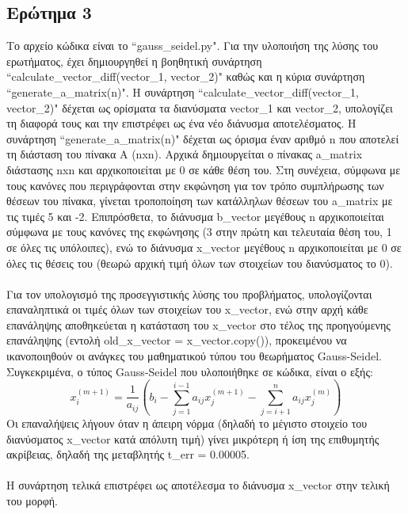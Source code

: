 \documentclass[a4paper,11pt]{article}
\newcommand{\lt}{\latintext}
\begin{document}
\subsection*{Ερώτημα 3}
Το αρχείο κώδικα είναι το {\lt ``gauss\_seidel.py"}.
Για την υλοποιήση της λύσης του ερωτήματος, έχει δημιουργηθεί η βοηθητική συνάρτηση {\lt ``calculate\_vector\_diff(vector\_1, vector\_2)"} καθώς και η κύρια συνάρτηση {\lt ``generate\_a\_matrix(n)"}.
Η συνάρτηση {\lt ``calculate\_vector\_diff(vector\_1, vector\_2)"} δέχεται ως ορίσματα τα διανύσματα {\lt vector\_1} και {\lt vector\_2}, υπολογίζει τη διαφορά τους και την επιστρέφει ως ένα νέο διάνυσμα αποτελέσματος.
Η συνάρτηση {\lt ``generate\_a\_matrix(n)"} δέχεται ως όρισμα έναν αριθμό {\lt n} που αποτελεί τη διάσταση του πίνακα Α ({\lt nxn}). Αρχικά δημιουργείται ο πίνακας {\lt a\_matrix} διάστασης {\lt nxn} και αρχικοποιείται με 0 σε κάθε θέση του. Στη συνέχεια, σύμφωνα με τους κανόνες που περιγράφονται στην εκφώνηση για τον τρόπο συμπλήρωσης των θέσεων του πίνακα, γίνεται τροποποίηση των κατάλληλων θέσεων του {\lt a\_matrix} με τις τιμές 5 και -2. Επιπρόσθετα, το διάνυσμα {\lt b\_vector} μεγέθους {\lt n} αρχικοποιείται σύμφωνα με τους κανόνες της εκφώνησης (3 στην πρώτη και τελευταία θέση του, 1 σε όλες τις υπόλοιπες), ενώ το διάνυσμα {\lt x\_vector } μεγέθους {\lt n} αρχικοποιείται με 0 σε όλες τις θέσεις του (θεωρώ αρχική τιμή όλων των στοιχείων του διανύσματος το 0).\\
\\ Για τον υπολογισμό της προσεγγιστικής  λύσης του προβλήματος, υπολογίζονται επαναληπτικά οι τιμές όλων των στοιχείων του {\lt x\_vector}, ενώ στην αρχή κάθε επανάληψης αποθηκεύεται η κατάσταση του {\lt x\_vector} στο τέλος της προηγούμενης επανάληψης (εντολή {\lt old\_x\_vector = x\_vector.copy()}), προκειμένου να ικανοποιηθούν οι ανάγκες του μαθηματικού τύπου του θεωρήματος {\lt Gauss-Seidel}.  
Συγκεκριμένα, ο τύπος {\lt Gauss-Seidel} που υλοποιήθηκε σε κώδικα, είναι ο εξής:
\begin{equation*}
x_{i}^{(m+1)} = \frac{1}{a_{ij}}  \left( b_{i} - \sum_{j=1}^{i-1} a_{ij} x_{j}^{(m+1)} - \sum_{j=i+1}^{n} a_{ij} x_{j}^{(m)} \right)
\end{equation*}
Οι επαναλήψεις λήγουν όταν η άπειρη νόρμα (δηλαδή το μέγιστο στοιχείο του διανύσματος {\lt x\_vector} κατά απόλυτη τιμή) γίνει μικρότερη ή ίση της επιθυμητής ακρίβειας, δηλαδή της μεταβλητής {\lt t\_err = 0.00005}.\\
\\Η συνάρτηση τελικά επιστρέφει ως αποτέλεσμα το διάνυσμα {\lt x\_vector} στην τελική του μορφή.

\end{document}

